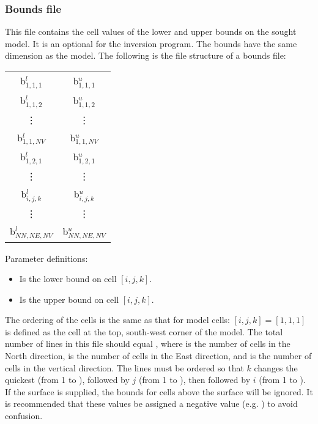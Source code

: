
\subsubsection{Bounds file}

This file contains the cell values of the lower and upper bounds on the sought model. It is an optional for the inversion program. The bounds have the same dimension as the model. The following is the file structure of a bounds file:
%
\begin{fileExample}
\begin{tabular}{|cc|}
\hline
b$^l_{1,1,1}$ & b$^u_{1,1,1}$\\
b$^l_{1,1,2}$ & b$^u_{1,1,2}$\\
\vdots & \vdots \\
b$^l_{1,1,NV}$ & b$^u_{1,1,NV}$\\
b$^l_{1,2,1}$ & b$^u_{1,2,1}$\\
\vdots & \vdots \\
b$^l_{i,j,k}$ & b$^u_{i,j,k}$\\
\vdots & \vdots \\
b$^l_{NN,NE,NV}$ & b$^u_{NN,NE,NV}$\\
\hline
\end{tabular}
\end{fileExample}

Parameter definitions:
\begin{itemize}
\item[\codeName{{b}$^l_{i,j,k}$}] Is the lower bound on cell $[i, j, k]$.
\item[\codeName{{b}$^u_{i,j,k}$}] Is the upper bound on cell $[i, j, k]$.
\end{itemize}

The ordering of the cells is the same as that for model cells: $[i, j, k]=[1, 1, 1]$ is defined as the cell at the top, south-west corner of the model. The total number of lines in this file should equal , where  is the number of cells in the North direction,  is the number of cells in the East direction, and  is the number of cells in the vertical direction. The lines must be ordered so that $k$ changes the quickest (from 1 to ), followed by $j$ (from 1 to ), then followed by $i$ (from 1 to ). If the surface  is supplied, the bounds for cells above the surface will be ignored. It is recommended that these values be assigned a negative value (e.g. ) to avoid confusion.